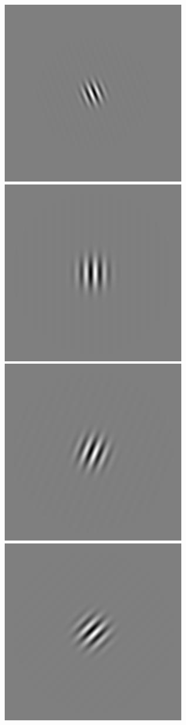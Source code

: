 \begin{figure}
\begin{center}
 \includegraphics[scale=0.1]{ch4/figures/iGabor2_7.jpg}\\
 \includegraphics[scale=0.1]{ch4/figures/iGabor3_0.jpg}
 \includegraphics[scale=0.1]{ch4/figures/iGabor3_1.jpg}
 \includegraphics[scale=0.1]{ch4/figures/iGabor3_2.jpg}

\end{center}
\end{figure}

